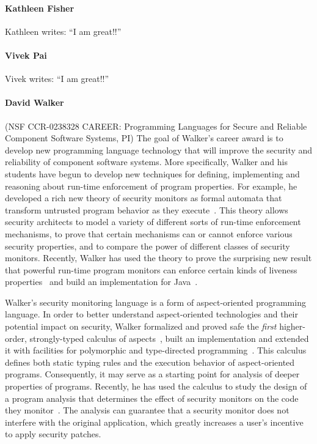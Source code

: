 \documentclass[11pt]{article}
\begin{document}
\paragraph*{Kathleen Fisher} Kathleen writes:  ``I am great!!''

\paragraph*{Vivek Pai} Vivek writes:  ``I am great!!''

\paragraph*{David Walker} (NSF CCR-0238328 CAREER: Programming Languages for Secure and Reliable Component Software
Systems, PI)
The goal of Walker's career award is to develop new programming language
technology that will improve the security and reliability of component software systems.
More specifically, Walker and his students have begun to develop new techniques for defining,
implementing and reasoning about run-time enforcement of program properties.
For example, he developed a rich new theory of security monitors as formal
automata that transform untrusted program behavior as they 
execute~\cite{ligatti+:edit-automata}.
This theory allows security
architects to model a variety of different sorts of run-time
enforcement mechanisms, to prove that certain mechanisms can or cannot
enforce various security properties, and to compare the power of
different classes of security monitors.    Recently, Walker 
has used the theory to prove the surprising new result that powerful run-time
program monitors can enforce certain kinds of liveness properties~\cite{ligatti+:renewal}
and build an implementation for Java~\cite{bauer+:polymer}.

Walker's security monitoring language is a form of aspect-oriented programming language.
In order to better understand aspect-oriented technologies and their
potential impact on security, Walker formalized and proved
safe the {\em first} higher-order, strongly-typed calculus of 
aspects~\cite{walker+:aspects}, built an implementation and extended it with facilities for polymorphic
and type-directed programming~\cite{dantas+:polyaml}.  This calculus defines
both static typing rules and the execution behavior of aspect-oriented
programs.  Consequently, it may
serve as a starting point for analysis of deeper properties of programs.
Recently, he has used the calculus to study the design of a
program analysis that determines the effect of security monitors on
the code they monitor~\cite{dantas+:harmless-advice,dantas+:harmless-popl}.   The analysis
can guarantee that a security monitor does not interfere with the 
original application, which greatly increases a user's incentive
to apply security patches.
\end{document}
